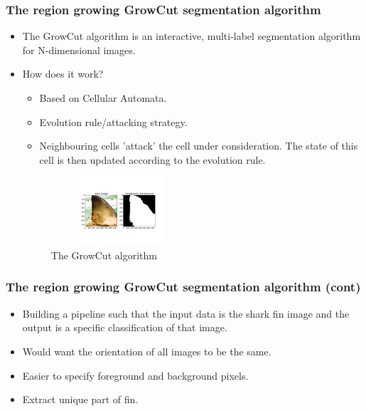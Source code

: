 \documentclass{beamer}
\newcommand{\myitem}{\item[$-$]}
\begin{document}
\begin{frame}
\frametitle{The region growing GrowCut segmentation algorithm}
\begin{itemize}
\item The GrowCut algorithm is an interactive, multi-label segmentation algorithm for N-dimensional images\cite{alg}.
\pause
\item How does it work? 
\begin{itemize}
\myitem Based on Cellular Automata\cite{cellularoutomata}.
\myitem Evolution rule/attacking strategy.
\myitem Neighbouring cells 'attack' the cell under consideration.  The state of this cell is then updated
according to the evolution rule.
\end{itemize}
\pause
\begin{figure}
\centering
\includegraphics[width=2in, height=1in]{demo1.png}
\caption{The GrowCut algorithm}
\end{figure}
\end{itemize}
\end{frame}

\begin{frame}
\frametitle{The region growing GrowCut segmentation algorithm (cont)}
\begin{itemize}
\item Building a pipeline such that the input data is the shark fin image and the output is a specific
classification of that image.
\item Would want the orientation of all images to be the same.
\item Easier to specify foreground and background pixels.
\item Extract unique part of fin.
\end{itemize}
\end{frame}
\end{document}
